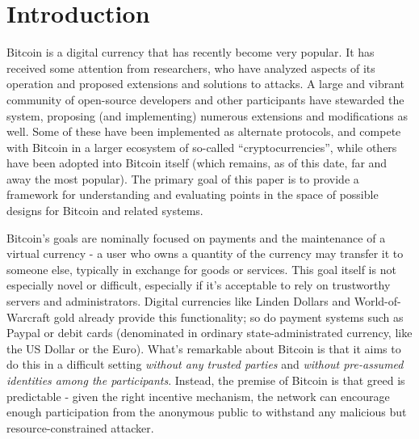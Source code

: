 \section{Introduction}\label{intro}

Bitcoin is a digital currency that has recently become very popular.  It has received some attention from researchers, who have analyzed aspects of its operation and proposed extensions and solutions to attacks. A large and vibrant community of open-source developers and other participants have stewarded the system, proposing (and implementing) numerous extensions and modifications as well. Some of these have been implemented as alternate protocols, and compete with Bitcoin in a larger ecosystem of so-called ``cryptocurrencies'', while others have been adopted into Bitcoin itself (which remains, as of this date, far and away the most popular). The primary goal of this paper is to provide a framework for understanding and evaluating points in the space of possible designs for Bitcoin and related systems.

Bitcoin's goals are nominally focused on payments and the maintenance of a virtual currency - a user who owns a quantity of the currency may transfer it to someone else, typically in exchange for goods or services. This goal itself is not especially novel or difficult, especially if it's acceptable to rely on trustworthy servers and administrators. Digital currencies like Linden Dollars and World-of-Warcraft gold already provide this functionality; so do payment systems such as Paypal or debit cards (denominated in ordinary state-administrated currency, like the US Dollar or the Euro). What's remarkable about Bitcoin is that it aims to do this in a difficult setting {\em without any trusted parties} and {\em without pre-assumed identities among the participants}. Instead, the premise of Bitcoin is that greed is predictable - given the right incentive mechanism, the network can encourage enough participation from the anonymous public to withstand any malicious but resource-constrained attacker. 

